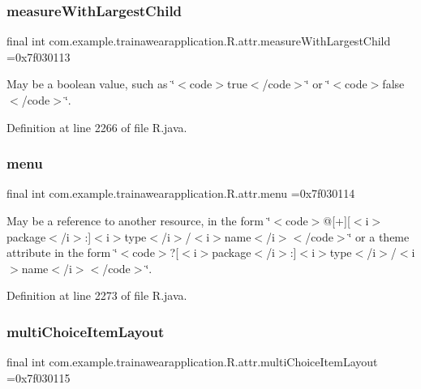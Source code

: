 \subsubsection{\texorpdfstring{measureWithLargestChild}{measureWithLargestChild}}
{\footnotesize\ttfamily final int com.\+example.\+trainawearapplication.\+R.\+attr.\+measure\+With\+Largest\+Child =0x7f030113\hspace{0.3cm}{\ttfamily [static]}}

May be a boolean value, such as \char`\"{}$<$code$>$true$<$/code$>$\char`\"{} or \char`\"{}$<$code$>$false$<$/code$>$\char`\"{}. 

Definition at line 2266 of file R.\+java.

\mbox{\label{classcom_1_1example_1_1trainawearapplication_1_1_r_1_1attr_a7bf0fad85d31059368ab00b7130a1bdf}} 
\subsubsection{\texorpdfstring{menu}{menu}}
{\footnotesize\ttfamily final int com.\+example.\+trainawearapplication.\+R.\+attr.\+menu =0x7f030114\hspace{0.3cm}{\ttfamily [static]}}

May be a reference to another resource, in the form \char`\"{}$<$code$>$@\mbox{[}+\mbox{]}\mbox{[}$<$i$>$package$<$/i$>$\+:\mbox{]}$<$i$>$type$<$/i$>$/$<$i$>$name$<$/i$>$$<$/code$>$\char`\"{} or a theme attribute in the form \char`\"{}$<$code$>$?\mbox{[}$<$i$>$package$<$/i$>$\+:\mbox{]}$<$i$>$type$<$/i$>$/$<$i$>$name$<$/i$>$$<$/code$>$\char`\"{}. 

Definition at line 2273 of file R.\+java.

\mbox{\label{classcom_1_1example_1_1trainawearapplication_1_1_r_1_1attr_a91edfc3215b85f71210a803a6d8accbb}} 
\subsubsection{\texorpdfstring{multiChoiceItemLayout}{multiChoiceItemLayout}}
{\footnotesize\ttfamily final int com.\+example.\+trainawearapplication.\+R.\+attr.\+multi\+Choice\+Item\+Layout =0x7f030115\hspace{0.3cm}{\ttfamily [static]}}

